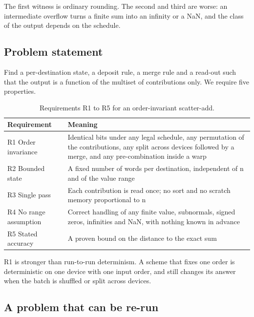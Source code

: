 \documentclass[journal]{IEEEtran}
\begin{document}
The first witness is ordinary rounding. The second and third are worse:
an intermediate overflow turns a finite sum into an infinity or a NaN,
and the class of the output depends on the schedule.

\hypertarget{problem-statement}{%
\subsection{Problem statement}\label{problem-statement}}

Find a per-destination state, a deposit rule, a merge rule and a
read-out such that the output is a function of the multiset of
contributions only. We require five properties.

\begin{table}[!htbp]\centering\small\setlength{\tabcolsep}{4pt}
\caption{Requirements R1 to R5 for an order-invariant scatter-add.}\label{tab:2}
\begin{tabularx}{\linewidth}{>{\raggedright\arraybackslash\hsize=0.733\hsize}X>{\raggedright\arraybackslash\hsize=1.267\hsize}X}
\toprule
Requirement & Meaning \\
\midrule
R1 Order invariance & Identical bits under any legal schedule, any permutation of the
contributions, any split across devices followed by a merge, and any
pre-combination inside a warp \\
R2 Bounded state & A fixed number of words per destination, independent of n and of the
value range \\
R3 Single pass & Each contribution is read once; no sort and no scratch memory
proportional to n \\
R4 No range assumption & Correct handling of any finite value, subnormals, signed zeros,
infinities and NaN, with nothing known in advance \\
R5 Stated accuracy & A proven bound on the distance to the exact sum \\
\bottomrule
\end{tabularx}
\end{table}

R1 is stronger than run-to-run determinism. A scheme that fixes one
order is deterministic on one device with one input order, and still
changes its answer when the batch is shuffled or split across devices.

\hypertarget{a-problem-that-can-be-re-run}{%
\subsection{A problem that can be
re-run}\label{a-problem-that-can-be-re-run}}
\end{document}
